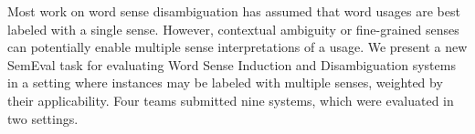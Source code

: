 Most work on word sense disambiguation has assumed that word usages are best labeled with a single sense.  However, contextual ambiguity or fine-grained
 senses can potentially enable multiple sense interpretations of a usage.  We
 present a new SemEval task for evaluating Word Sense Induction and
 Disambiguation systems in a setting where instances may be labeled with
 multiple senses, weighted by their applicability.  Four teams submitted nine
 systems, which were evaluated in two settings.

